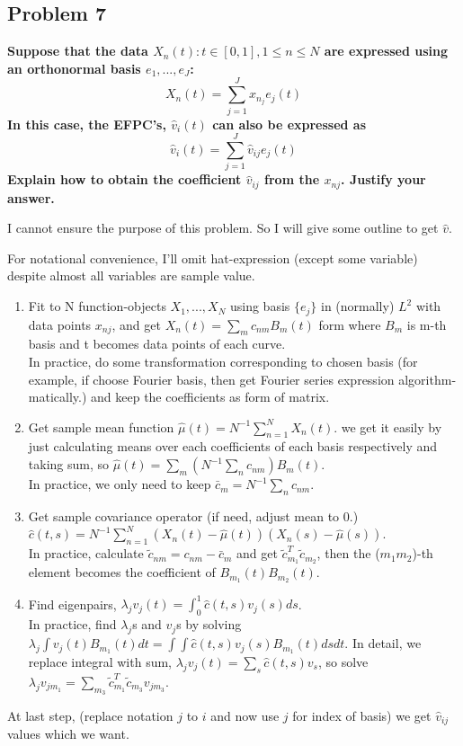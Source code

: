 \documentclass{article}
\begin{document}
\subsection{Problem 7}
\textbf{
Suppose that the data ${X_n(t):t\in[0,1], 1\leq n\leq N}$
are expressed using an orthonormal basis $e_1,...,e_J$:
\[X_n(t)=\sum_{j=1}^J x_{n_j}e_j(t)\]
In this case, the EFPC's, $\hat{v}_i(t)$ can also be expressed as
\[\hat{v}_i(t)=\sum_{j=1}^J \hat{v}_{ij}e_j(t)\]
Explain how to obtain the coefficient $\hat{v}_{ij}$ from the $x_{nj}$. 
Justify your answer.
}

I cannot ensure the purpose of this problem. So I will give some outline to get $\hat{v}$.

For notational convenience, I'll omit hat-expression (except some variable) despite almost all variables are sample value.
\begin{enumerate}
\item Fit to N function-objects $X_1,...,X_N$ using basis $\{e_j\}$ in (normally) $L^2$ with data points $x_{nj}$,
    and get $X_n(t)=\sum_m c_{nm}B_m(t)$ form where $B_m$ is m-th basis and t becomes data points of each curve. \\
    In practice, do some transformation corresponding to chosen basis 
    (for example, if choose Fourier basis, then get Fourier series expression algorithm-matically.)
     and keep the coefficients as form of matrix.
\item Get sample mean function $\hat{\mu}(t)=N^{-1}\sum_{n=1}^NX_n(t)$.
    we get it easily by just calculating means over each coefficients of each basis respectively and taking sum,
    so $\hat{\mu}(t)=\sum_m(N^{-1}\sum_nc_{nm})B_m(t)$. \\
    In practice, we only need to keep $\bar{c}_m=N^{-1}\sum_nc_{nm}$.
\item Get sample covariance operator (if need, adjust mean to 0.) $\hat{c}(t,s)=N^{-1}\sum_{n=1}^N(X_n(t)-\hat{\mu}(t))(X_n(s)-\hat{\mu}(s))$.\\
    In practice, calculate $\tilde{c}_{nm}=c_{nm}-\bar{c}_{m}$ and get $\tilde{c}_{m_1}^{T}\tilde{c}_{m_2}$,
    then the ($m_1m_2$)-th element becomes the coefficient of $B_{m_1}(t)B_{m_2}(t)$.
\item Find eigenpairs, $\lambda_j v_j(t) = \int_0^1\hat{c}(t,s)v_j(s)ds$. \\ 
    In practice, find $\lambda_j$s and $v_j$s by solving $\lambda_j\int v_j(t)B_{m_1}(t)dt = \int \int \hat{c}(t,s)v_j(s)B_{m_1}(t)ds dt$.
    In detail, we replace integral with sum, $\lambda_j v_j(t) = \sum_{s} \hat{c}(t,s)v_s$, so solve
    $\lambda_jv_{jm_1}=\sum_{m_3}\tilde{c}_{m_1}^{T}\tilde{c}_{m_3} v_{jm_3}$.
\end{enumerate}
At last step, (replace notation $j$ to $i$ and now use $j$ for index of basis) we get $\hat{v}_{ij}$ values which we want.
\end{document}
